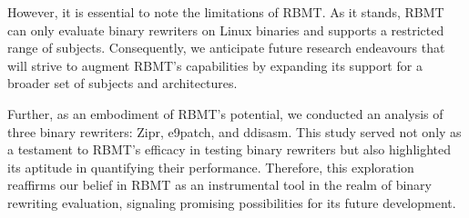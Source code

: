 \documentclass[a4paper,11pt,oneside]{report}
\begin{document}
However, it is essential to note the limitations of RBMT. As it stands, RBMT can only evaluate binary rewriters on 
Linux binaries and supports a restricted range of subjects. Consequently, we anticipate future research 
endeavours that will strive to augment RBMT's capabilities by expanding its support for a broader set of subjects and architectures.

Further, as an embodiment of RBMT's potential, we conducted an analysis of three binary rewriters: Zipr, e9patch,
and ddisasm. This study served not only as a testament to RBMT's efficacy in testing binary rewriters but also 
highlighted its aptitude in quantifying their performance. Therefore, this exploration reaffirms our belief in 
RBMT as an instrumental tool in the realm of binary rewriting evaluation, signaling promising possibilities for
its future development.

\cleardoublepage
{}
{}
\printbibliography

%
%
\end{document}
